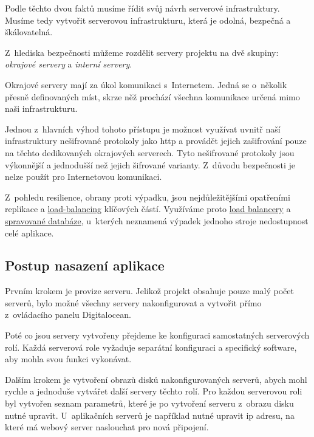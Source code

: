 \emptyLine

Podle těchto dvou faktů musíme řídit svůj návrh serverové infrastruktury.  Musíme tedy vytvořit serverovou infrastrukturu, která je odolná, bezpečná a škálovatelná.

Z~hlediska bezpečnosti můžeme rozdělit servery projektu \bso{} na dvě skupiny: \textit{okrajové servery} a \textit{interní servery}.

Okrajové servery mají za úkol komunikaci s~Internetem.
Jedná se o~několik přesně definovaných míst, skrze něž prochází všechna komunikace určená mimo naši infrastrukturu.

Jednou z~hlavních výhod tohoto přístupu je možnost využívat uvnitř naší infrastruktury nešifrované protokoly jako \acrshort{http}
a provádět jejich zašifrování pouze na těchto dedikovaných okrajových serverech.
Tyto nešifrované protokoly jsou výkonnější a jednodušší než jejich šifrované varianty\cite{http-faster-https}.
Z~důvodu bezpečnosti je nelze použít pro Internetovou komunikaci.

Z~pohledu resilience, obrany proti výpadku, jsou nejdůležitějšími opatřeními replikace a \hyperref[sub:load-balancing]{load-balancing} klíčových částí. Využíváme proto \hyperref[sub:load-balancing]{load balancery} a \hyperref[subsub:managed-databases]{spravované databáze}, u~kterých neznamená výpadek jednoho stroje nedostupnost celé aplikace.


\subsection{Postup nasazení aplikace}
\label{sub:deployment}

Prvním krokem je provize serveru. Jelikož projekt \bso{} obsahuje pouze malý počet serverů, bylo možné všechny servery nakonfigurovat a vytvořit přímo z~ovládacího panelu Digitalocean.

Poté co jsou servery vytvořeny přejdeme ke konfiguraci samostatných serverových rolí. Každá serverová role vyžaduje separátní konfiguraci a specifický software, aby mohla svou funkci vykonávat.

Dalším krokem je vytvoření obrazů disků nakonfigurovaných serverů, abych mohl rychle a jednoduše vytvářet další servery těchto rolí. Pro každou serverovou roli byl vytvořen seznam parametrů, které je po vytvoření serveru z~obrazu disku nutné upravit. U~aplikačních serverů je například nutné upravit \acrshort{ip} adresu, na které má webový server naslouchat pro nová připojení. 

